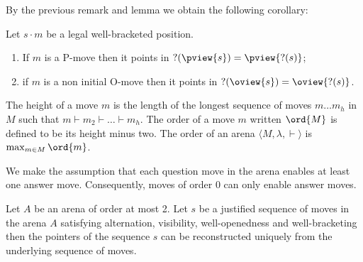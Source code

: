 \vspace{10pt}
By the previous remark and lemma we obtain the following corollary:
\begin{corollary}
\label{cor:pendingview}
Let $s \cdot m$ be a legal well-bracketed position.
\begin{enumerate}
\item If $m$ is a P-move then it points in $?(\pview{s}) = \pview{?(s)}$;
\item if $m$ is a non initial O-move then it points in $?(\oview{s}) = \oview{?(s)}$.
\end{enumerate}

\end{corollary}



The height of a move $m$ is the length of the longest sequence of moves
$m \ldots m_h$ in $M$ such that $m \vdash m_2 \vdash \ldots \vdash m_h$.
The order of a move $m$ written $\ord{M}$ is defined to be its height minus two.
The order of an arena $\langle M, \lambda, \vdash \rangle$ is $\max_{m \in M} \ord{m}$.

We make the assumption that each question move in the arena enables at least one answer move. Consequently, moves of order $0$ can only
enable answer moves.

\begin{lemma}
\label{lem:ptr_superfluous_atorder2} Let $A$ be an arena of order at
most 2. Let $s$ be a justified sequence of moves in the arena $A$
satisfying
 alternation, visibility, well-openedness and well-bracketing then
the pointers of the sequence $s$ can be reconstructed uniquely from
the underlying sequence of moves.
\end{lemma}



